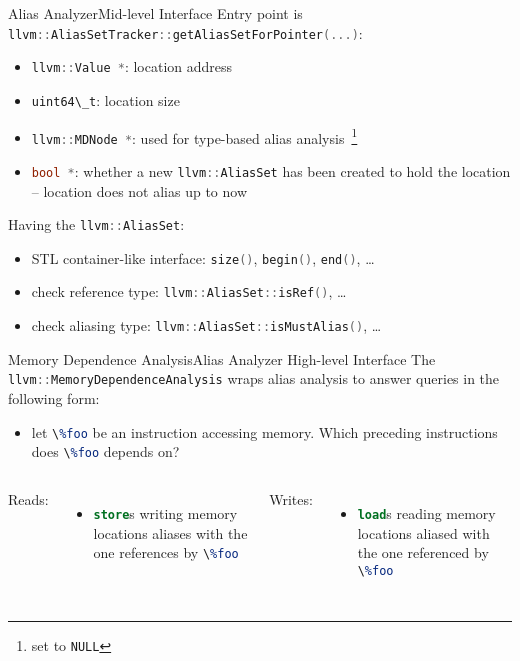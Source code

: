 \documentclass[10pt,mathserif]{beamer}
\newcommand{\cppinline}[1]{\lstinline[language=C++]!#1!}
\newcommand{\llvminline}[1]{\lstinline[language=LLVM]!#1!}
\begin{document}
\begin{frame}{Alias Analyzer}{Mid-level Interface}
Entry point is \cppinline{llvm::AliasSetTracker::getAliasSetForPointer(...)}:

\begin{itemize}
\item \cppinline{llvm::Value *}: location address
\item \cppinline{uint64\_t}: location size
\item \cppinline{llvm::MDNode *}: used for type-based alias
      analysis~\footnote{set to \cppinline{NULL}}
\item \cppinline{bool *}: whether a new \cppinline{llvm::AliasSet} has been
      created to hold the location -- location does not alias up to now
\end{itemize}

Having the \cppinline{llvm::AliasSet}:

\begin{itemize}
\item STL container-like interface: \cppinline{size()}, \cppinline{begin()},
      \cppinline{end()}, \ldots
\item check reference type: \cppinline{llvm::AliasSet::isRef()}, \ldots
\item check aliasing type: \cppinline{llvm::AliasSet::isMustAlias()}, \ldots
\end{itemize}
\end{frame}

\begin{frame}{Memory Dependence Analysis}{Alias Analyzer High-level Interface}
The \cppinline{llvm::MemoryDependenceAnalysis} wraps alias analysis to answer
queries in the following form:

\begin{itemize}
\item let \llvminline{\%foo} be an instruction accessing memory. Which
      preceding instructions does \llvminline{\%foo} depends on?
\end{itemize}

\begin{columns}[t]
Reads:

\begin{itemize}
\item \llvminline{store}s writing memory locations aliases with the one
      references by \llvminline{\%foo}
\end{itemize}

Writes:

\begin{itemize}
\item \llvminline{load}s reading memory locations aliased with the one
      referenced by \llvminline{\%foo}
\end{itemize}
\end{columns}
\end{frame}
\end{document}
